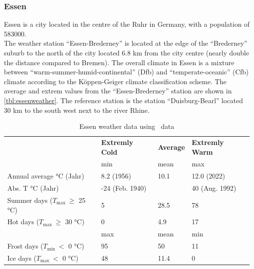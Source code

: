\documentclass[12pt,a4paper, english,twoside]{article}
\begin{document}
  \subsubsection{Essen}
  Essen is a city located in the centre of the Ruhr in Germany, with a population of 583000.  \\
%
  The weather station ``Essen-Brederney'' is located at the edge of the ``Brederney'' suburb to the north of the city located 6.8 km from the city centre (nearly double the distance compared to Bremen). 
  The overall climate in Essen is a mixture between ``warm-summer-humid-continental'' (Dfb) and ``temperate-oceanic'' (Cfb) climate according to the Köppen-Geiger climate classification scheme.
  The average and extrem values from the ``Essen-Brederney'' station are shown in \cref{tbl:essenweather}.
  The reference station is the station ``Duisburg-Bearl'' located 30 km to the south west next to the river Rhine.\\
  \begin{table}[ht]
    \centering
    \renewcommand{\arraystretch}{1.4}
    \caption{Essen weather data using~\cite{DWD2024b} data\label{tab:essenweather}}
    \begin{tabular}{p{3.5cm}p{2.5cm}lp{2.5cm}}
      \toprule
      & \textbf{Extremly Cold} & \textbf{Average} & \textbf{Extremly Warm} \\
      & min & mean & max \\
      \midrule
      Annual average °C \newline (Jahr)     &   8.2 \newline(1956)     & 10.1   & 12.0 \newline (2022)      \\
      Abs. T °C \newline (Jahr)             & -24 \newline(Feb. 1940)  &        & 40   \newline (Aug. 1992) \\
      Summer days \newline($T_{\max}~\ge$  25 °C) & 5                  & 28.5   & 78 \\
      Hot days \newline($T_{\max}~\ge$  30 °C)    & 0                  & 4.9    & 17 \\
      \midrule
      & max & mean & min \\
      \midrule
      Frost days \newline($T_{\min}~<$  0 °C)     & 95   & 50     & 11 \\
      Ice days \newline($T_{\max}~<$  0 °C)       & 48   & 11.4   & 0  \\
      \bottomrule
    \end{tabular}
  \end{table}
\end{document}
